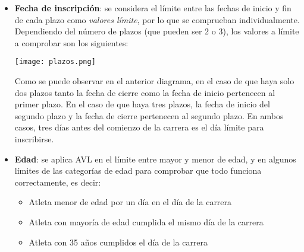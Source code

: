 \begin{itemize}
	\item \textbf{Fecha de inscripción}: se considera el límite entre las fechas de inicio y
		fin de cada plazo como \textit{valores límite}, por lo que se comprueban individualmente.
		Dependiendo del número de plazos (que pueden ser 2 o 3), los valores a límite a comprobar
		son los siguientes: \\\begin{minipage}{\linewidth}
			\centering
			\texttt{[image: plazos.png]}
		\end{minipage}

		Como se puede observar en el anterior diagrama, en el caso de que haya solo dos plazos
		tanto la fecha de cierre como la fecha de inicio pertenecen al primer plazo. En el caso
		de que haya tres plazos, la fecha de inicio del segundo plazo y la fecha de cierre
		pertenecen al segundo plazo. En ambos casos, tres días antes del comienzo de la carrera
		es el día límite para inscribirse.
	\item \textbf{Edad}: se aplica AVL en el límite entre mayor y menor de edad, y en algunos
		límites de las categorías de edad para comprobar que todo funciona correctamente, es
		decir: \begin{itemize}
			\item Atleta menor de edad por un día en el día de la carrera
			\item Atleta con mayoría de edad cumplida el mismo día de la carrera
			\item Atleta con 35 años cumplidos el día de la carrera
		\end{itemize}
\end{itemize}
